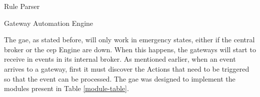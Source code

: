 \begin{Paragraph}{Rule Parser}
\end{Paragraph}

\begin{Paragraph}{Gateway Automation Engine}

The \acf{gae}, as stated before, will only work in emergency states, either if the central broker or the \ac{cep} Engine are down. When this happens, the gateways will start to receive in events in its internal broker. As mentioned earlier, when an event arrives to a gateway, first it must discover the Actions that need to be triggered so that the event can be processed. The \ac{gae} was designed to implement the modules present in Table \ref{module-table}.
 
\begin{table}[H]

\end{table}
\end{Paragraph}
